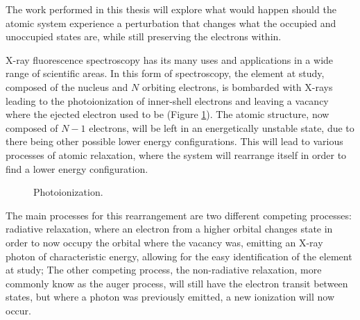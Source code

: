 The work performed in this thesis will explore what would happen should the atomic system experience a perturbation that changes what the occupied and unoccupied states are, while still preserving the electrons within.


X-ray fluorescence spectroscopy has its many uses and applications in a wide range of scientific areas. In this form of spectroscopy, the element at study, composed of the nucleus and $N$ orbiting electrons, is bombarded with X-rays leading to the photoionization of inner-shell electrons and leaving a vacancy where the ejected electron used to be (Figure \ref{fig:photoionization}).
The atomic structure, now composed of $N-1$ electrons, will be left in an energetically unstable state, due to there being other possible lower energy configurations. This will lead to various processes of atomic relaxation, where the system will rearrange itself in order to find a lower energy configuration.

\begin{figure}[h!]
    \centering
    \caption{Photoionization.}\label{fig:photoionization}
\end{figure}



The main processes for this rearrangement are two different competing processes: radiative relaxation, where an electron from a higher orbital changes state in order to now occupy the orbital where the vacancy was, emitting an X-ray photon of characteristic energy, allowing for the easy identification of the element at study;
The other competing process, the non-radiative relaxation, more commonly know as the auger process, will still have the electron transit between states, but where  a photon was previously emitted, a new ionization will now occur.



